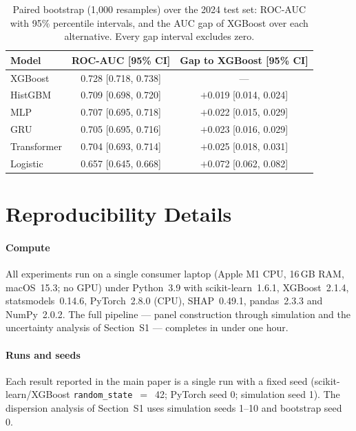 \documentclass[letterpaper]{article}
\begin{document}
\begin{table}[h]
\centering
\begin{tabular}{lcc}
\toprule
Model & ROC-AUC [95\% CI] & Gap to XGBoost [95\% CI] \\
\midrule
XGBoost      & 0.728 [0.718, 0.738] & --- \\
HistGBM      & 0.709 [0.698, 0.720] & $+$0.019 [0.014, 0.024] \\
MLP          & 0.707 [0.695, 0.718] & $+$0.022 [0.015, 0.029] \\
GRU          & 0.705 [0.695, 0.716] & $+$0.023 [0.016, 0.029] \\
Transformer  & 0.704 [0.693, 0.714] & $+$0.025 [0.018, 0.031] \\
Logistic     & 0.657 [0.645, 0.668] & $+$0.072 [0.062, 0.082] \\
\bottomrule
\end{tabular}
\caption{Paired bootstrap (1{,}000 resamples) over the 2024 test set:
ROC-AUC with 95\% percentile intervals, and the AUC gap of XGBoost over each
alternative. Every gap interval excludes zero.}
\label{tab:auc_ci}
\end{table}

\section{Reproducibility Details}

\paragraph{Compute}
All experiments run on a single consumer laptop (Apple M1 CPU, 16\,GB RAM,
macOS~15.3; no GPU) under Python~3.9 with scikit-learn~1.6.1, XGBoost~2.1.4,
statsmodels~0.14.6, PyTorch~2.8.0 (CPU), SHAP~0.49.1, pandas~2.3.3 and
NumPy~2.0.2. The full pipeline --- panel construction through simulation and
the uncertainty analysis of Section~S1 --- completes in under one hour.

\paragraph{Runs and seeds}
Each result reported in the main paper is a single run with a fixed seed
(scikit-learn/XGBoost \texttt{random\_state}~$=$~42; PyTorch seed 0;
simulation seed 1). The dispersion analysis of Section~S1 uses simulation
seeds 1--10 and bootstrap seed 0.
\end{document}
